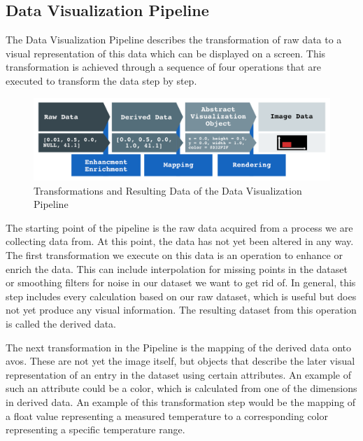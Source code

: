 \subsection{Data Visualization Pipeline}
\label{sec:fundamentals:charting:pipeline}

The Data Visualization Pipeline describes the transformation of raw data to a
visual representation of this data which can be displayed on a screen. This
transformation is achieved through a sequence of four operations that are
executed to transform the data step by step. 

\begin{figure}[h]
    \centering
    \includegraphics[width=15cm]{resources/img/VisualizationPipeline}
    \caption{Transformations and Resulting Data of the Data Visualization Pipeline}
    \label{fig:pipeline}
\end{figure}

The starting point of the pipeline is the raw data acquired from a process
we are collecting data from. At this point, the data has not yet been altered in
any way. The first transformation we execute on this data is an operation to
enhance or enrich the data. This can include interpolation for missing points in
the dataset or smoothing filters for noise in our dataset we want to get rid of.
In general, this step includes every calculation based on our raw dataset, which
is useful but does not yet produce any visual information.  The resulting
dataset from this operation is called the derived data. 

The next transformation in the Pipeline is the mapping of the derived data onto
\glspl{avo}. These are not yet the image itself, but objects that describe the
later visual representation of an entry in the dataset using certain attributes.
An example of such an attribute could be a color, which is calculated from one
of the dimensions in derived data. An example of this transformation step would
be the mapping of a float value representing a measured temperature to a
corresponding color representing a specific temperature range.

